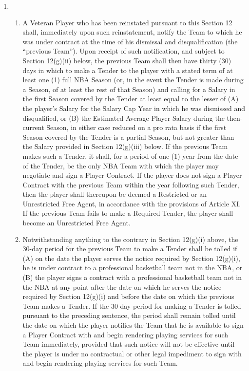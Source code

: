 \documentclass[
]{book}
\providecommand{\tightlist}{%
  \setlength{\itemsep}{0pt}\setlength{\parskip}{0pt}}
\begin{document}
\begin{enumerate}
\begin{enumerate}
  \end{enumerate}
\item
  \begin{enumerate}
  \def\labelenumii{(\roman{enumii})}
  \tightlist
  \item
    A Veteran Player who has been reinstated pursuant to this Section 12 shall, immediately upon such reinstatement, notify the Team to which he was under contract at the time of his dismissal and disqualification (the ``previous Team''). Upon receipt of such notification, and subject to Section 12(g)(ii) below, the previous Team shall then have thirty (30) days in which to make a Tender to the player with a stated term of at least one (1) full NBA Season (or, in the event the Tender is made during a Season, of at least the rest of that Season) and calling for a Salary in the first Season covered by the Tender at least equal to the lesser of (A) the player's Salary for the Salary Cap Year in which he was dismissed and disqualified, or (B) the Estimated Average Player Salary during the then-current Season, in either case reduced on a pro rata basis if the first Season covered by the Tender is a partial Season, but not greater than the Salary provided in Section 12(g)(iii) below. If the previous Team makes such a Tender, it shall, for a period of one (1) year from the date of the Tender, be the only NBA Team with which the player may negotiate and sign a Player Contract. If the player does not sign a Player Contract with the previous Team within the year following such Tender, then the player shall thereupon be deemed a Restricted or an Unrestricted Free Agent, in accordance with the provisions of Article XI. If the previous Team fails to make a Required Tender, the player shall become an Unrestricted Free Agent.
  \item
    Notwithstanding anything to the contrary in Section 12(g)(i) above, the 30-day period for the previous Team to make a Tender shall be tolled if (A) on the date the player serves the notice required by Section 12(g)(i), he is under contract to a professional basketball team not in the NBA, or (B) the player signs a contract with a professional basketball team not in the NBA at any point after the date on which he serves the notice required by Section 12(g)(i) and before the date on which the previous Team makes a Tender. If the 30-day period for making a Tender is tolled pursuant to the preceding sentence, the period shall remain tolled until the date on which the player notifies the Team that he is available to sign a Player Contract with and begin rendering playing services for such Team immediately, provided that such notice will not be effective until the player is under no contractual or other legal impediment to sign with and begin rendering playing services for such Team.

\end{enumerate}
\end{enumerate}
\end{document}
